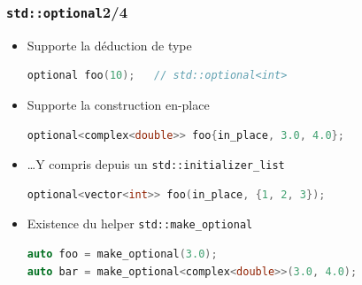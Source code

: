 \documentclass[C++.tex]{subfiles}
\begin{document}
\begin{frame}[fragile]
	\frametitle{\lstinline|std::optional|\titlehfill{}2/4}
	\begin{itemize}
		\item Supporte la déduction de type


	\begin{lstlisting}[language=C++]
optional foo(10);	// std::optional<int>\end{lstlisting}

		\item Supporte la construction \og en-place\fg{}
		
	\begin{lstlisting}[language=C++]
optional<complex<double>> foo{in_place, 3.0, 4.0};\end{lstlisting}
		
		\item \ldots Y compris depuis un \lstinline|std::initializer_list|
	\begin{lstlisting}[language=C++]
optional<vector<int>> foo(in_place, {1, 2, 3});\end{lstlisting}

		\item Existence du helper \lstinline|std::make_optional|
		
	\begin{lstlisting}[language=C++]
auto foo = make_optional(3.0);
auto bar = make_optional<complex<double>>(3.0, 4.0);\end{lstlisting}
	\end{itemize}
\end{frame}
\end{document}
